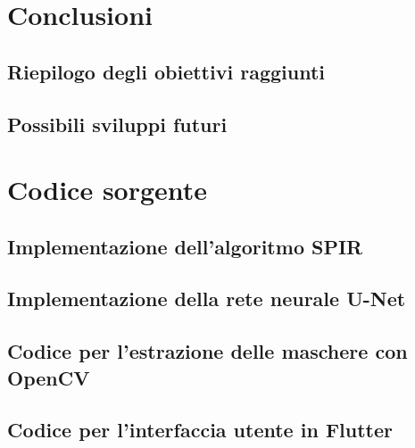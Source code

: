 \documentclass[a4paper,12pt]{report}
\begin{document}
\chapter{Conclusioni}
  \section{Riepilogo degli obiettivi raggiunti}
  \section{Possibili sviluppi futuri}

\chapter{Codice sorgente}
  \section{Implementazione dell'algoritmo SPIR}
  \section{Implementazione della rete neurale U-Net}
  \section{Codice per l'estrazione delle maschere con OpenCV}
  \section{Codice per l'interfaccia utente in Flutter}

  
  
\end{document}
